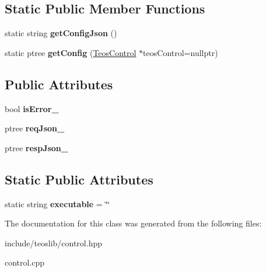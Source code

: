 \subsection*{Static Public Member Functions}
\begin{DoxyCompactItemize}
\item 
\mbox{\label{classteos_1_1_teos_control_a471b1a6439c02698604ae4e04d84ad71}} 
static string {\bfseries get\+Config\+Json} ()
\item 
\mbox{\label{classteos_1_1_teos_control_af722aad463e41fb96d4049372148d41c}} 
static ptree {\bfseries get\+Config} (\mbox{\hyperlink{classteos_1_1_teos_control}{Teos\+Control}} $\ast$teos\+Control=nullptr)
\end{DoxyCompactItemize}
\subsection*{Public Attributes}
\begin{DoxyCompactItemize}
\item 
\mbox{\label{classteos_1_1_teos_control_ac8e6788b523dcd724c7a424818da7849}} 
bool {\bfseries is\+Error\+\_\+}
\item 
\mbox{\label{classteos_1_1_teos_control_a6122f1a2263a80dacd315739861feac7}} 
ptree {\bfseries req\+Json\+\_\+}
\item 
\mbox{\label{classteos_1_1_teos_control_a1f5268be242e9f6182a083a4d4ec393e}} 
ptree {\bfseries resp\+Json\+\_\+}
\end{DoxyCompactItemize}
\subsection*{Static Public Attributes}
\begin{DoxyCompactItemize}
\item 
\mbox{\label{classteos_1_1_teos_control_a6c5d2f3f5abcfaf31728ae410a28b50b}} 
static string {\bfseries executable} = \char`\"{}\char`\"{}
\end{DoxyCompactItemize}


The documentation for this class was generated from the following files\+:\begin{DoxyCompactItemize}
\item 
include/teoslib/control.\+hpp\item 
control.\+cpp\end{DoxyCompactItemize}
